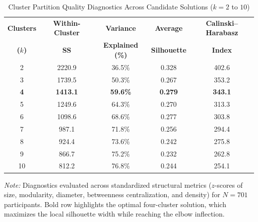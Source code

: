 \begin{table}[htbp]
\centering
\small
\setlength{\tabcolsep}{7pt}
\caption{Cluster Partition Quality Diagnostics Across Candidate Solutions ($k = 2$ to $10$)}
\label{tab:cluster_selection}
\begin{tabular}{ccccc}
\toprule
\textbf{Clusters} & \textbf{Within-Cluster} & \textbf{Variance} & \textbf{Average} & \textbf{Calinski--Harabasz} \\
\textbf{($k$)} & \textbf{SS} & \textbf{Explained (\%)} & \textbf{Silhouette} & \textbf{Index} \\
\midrule
2  & 2220.9 & 36.5\% & 0.328 & 402.6 \\
3  & 1739.5 & 50.3\% & 0.267 & 353.2 \\
\textbf{4} & \textbf{1413.1} & \textbf{59.6\%} & \textbf{0.279} & \textbf{343.1} \\
5  & 1249.6 & 64.3\% & 0.270 & 313.3 \\
6  & 1098.6 & 68.6\% & 0.277 & 303.8 \\
7  & 987.1  & 71.8\% & 0.256 & 294.4 \\
8  & 924.4  & 73.6\% & 0.242 & 275.8 \\
9  & 866.7  & 75.2\% & 0.232 & 262.8 \\
10 & 812.2  & 76.8\% & 0.244 & 254.1 \\
\bottomrule
\end{tabular}
\vspace{1ex}
\parbox{\linewidth}{\footnotesize \textit{Note:} Diagnostics evaluated across standardized structural metrics ($z$-scores of size, modularity, diameter, betweenness centralization, and density) for $N = 701$ participants. Bold row highlights the optimal four-cluster solution, which maximizes the local silhouette width while reaching the elbow inflection.}
\end{table}
